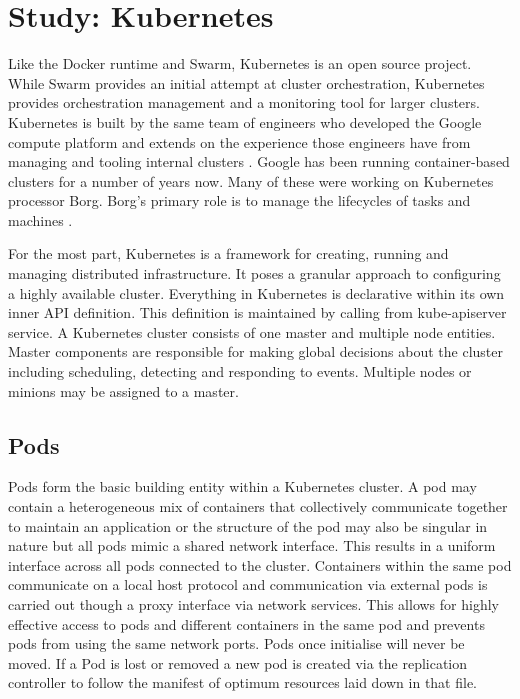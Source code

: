 \documentclass{article}
\begin{document}
\section{Study: Kubernetes}
Like the Docker runtime and Swarm, Kubernetes is an open source project. While Swarm provides an initial attempt at cluster orchestration, Kubernetes provides orchestration management and a monitoring tool for larger clusters. Kubernetes is built by the same team of engineers who developed the Google compute platform and extends on the experience those engineers have from managing and tooling internal clusters \citep{Brewer}. Google has been running container-based clusters for a number of years now. Many of these were working on Kubernetes processor Borg. Borg's primary role is to manage the lifecycles of tasks and machines \citep{Verma}.
\par
For the most part, Kubernetes is a framework for creating, running and managing distributed infrastructure. It poses a granular approach to configuring a highly available cluster. Everything in Kubernetes is declarative within its own inner API definition. This definition is maintained by calling from kube-apiserver service. A Kubernetes cluster consists of one master and multiple node entities. Master components are responsible for making global decisions about the cluster including scheduling, detecting and responding to events. Multiple nodes or minions may be assigned to a master.

\subsection{Pods}
Pods form the basic building entity within a Kubernetes cluster. A pod may contain a heterogeneous mix of containers that collectively communicate together to maintain an application or the structure of the pod may also be singular in nature but all pods mimic a shared network interface. This results in a uniform interface across all pods connected to the cluster. Containers within the same pod communicate on a local host protocol and communication via external pods is carried out though a proxy interface via network services. This allows for highly effective access to pods and different containers in the same pod and prevents pods from using the same network ports. Pods once initialise will never be moved. If a Pod is lost or removed a new pod is created via the replication controller to follow the manifest of optimum resources laid down in that file.
\end{document}
